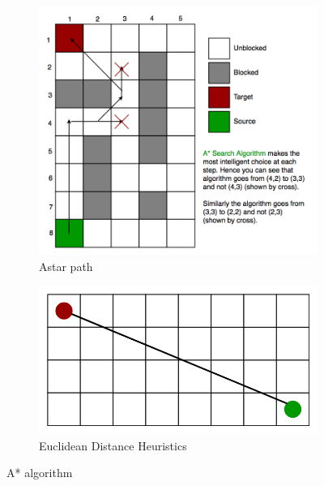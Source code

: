 \documentclass[bibliography=totoc]{scrartcl}
\begin{document}
\begin{figure}[H]
	\centering
	\begin{subfigure}[b]{0.3\linewidth}
		\includegraphics[width=\linewidth]{img/a_-search-algorithm.png}
        \caption{Astar path}
        \label{fig:astar_path}
        	
    \end{subfigure}
	\hspace{0.02\textwidth}
	\begin{subfigure}[b]{0.3\linewidth}
		\includegraphics[width=\linewidth]{img/a_-search-algorithm-euclidian_distance.png}
		\caption{Euclidean Distance Heuristics}
        \label{fig:EuclideanDistanceHeuristics}
	\end{subfigure}
 	\caption{A* algorithm \cite{Pic:astar}}
	\label{fig:astar}
    \vspace{-15pt}
\end{figure}
\end{document}
